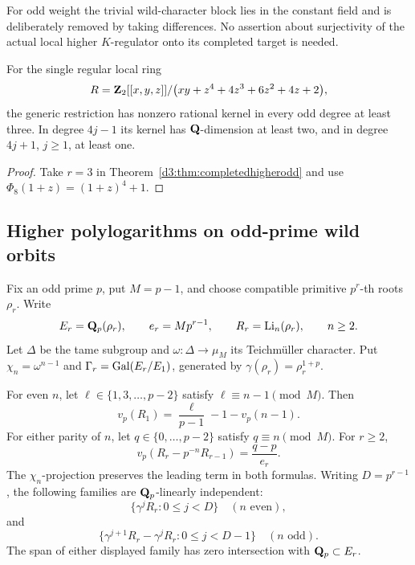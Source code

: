For odd weight the trivial wild-character block lies in the
constant field and is deliberately removed by taking differences.
No assertion about surjectivity of the actual local higher
$K$-regulator onto its completed target is needed.


\begin{corollary}
For the single regular local ring
\[
 R=\mathbf Z_2[[x,y,z]]/
 \bigl(xy+z^4+4z^3+6z^2+4z+2\bigr),
\]
the generic restriction has nonzero rational kernel in every
odd degree at least three. In degree $4j-1$ its kernel has
$\mathbf Q$-dimension at least two, and in degree $4j+1$, $j\geq1$,
at least one.
\end{corollary}
\begin{proof}
Take $r=3$ in Theorem~\ref{d3:thm:completedhigherodd} and use
$\Phi_8(1+z)=(1+z)^4+1$.
\end{proof}


\subsection{Higher polylogarithms on odd-prime wild orbits}
\label{d3:sec:oddprimehigherwild}

Fix an odd prime $p$, put $M=p-1$, and choose compatible primitive
$p^r$-th roots $\rho_r$. Write
\[
 E_r=\mathbf Q_p(\rho_r),\qquad e_r=Mp^{r-1},\qquad
 R_r=\operatorname{Li}_n(\rho_r),\qquad n\geq2.
\]
Let $\Delta$ be the tame subgroup and $\omega:\Delta\to\mu_M$
its Teichm\"uller character. Put $\chi_n=\omega^{n-1}$ and
$\Gamma_r=\operatorname{Gal}(E_r/E_1)$, generated by
$\gamma(\rho_r)=\rho_r^{1+p}$.

\begin{proposition}
\label{d3:prop:oddprimehigherwild}
For even $n$, let $\ell\in\{1,3,\ldots,p-2\}$ satisfy
$\ell\equiv n-1\pmod M$. Then
\begin{equation}\label{d3:eq:oddprimehigherbase}
 v_p(R_1)=\frac{\ell}{p-1}-1-v_p(n-1).
\end{equation}
For either parity of $n$, let $q\in\{0,\ldots,p-2\}$ satisfy
$q\equiv n\pmod M$. For $r\geq2$,
\begin{equation}\label{d3:eq:oddprimehighernew}
 v_p(R_r-p^{-n}R_{r-1})=\frac{q-p}{e_r}.
\end{equation}
The $\chi_n$-projection preserves the leading term in both formulas.
Writing $D=p^{r-1}$, the following families are $\mathbf Q_p$-linearly
independent:
\[
 \{\gamma^jR_r:0\leq j<D\}\quad(n\text{ even}),
\]
and
\[
 \{\gamma^{j+1}R_r-\gamma^jR_r:0\leq j<D-1\}
                                  \quad(n\text{ odd}).
\]
The span of either displayed family has zero intersection with
$\mathbf Q_p\subset E_r$.
\end{proposition}

